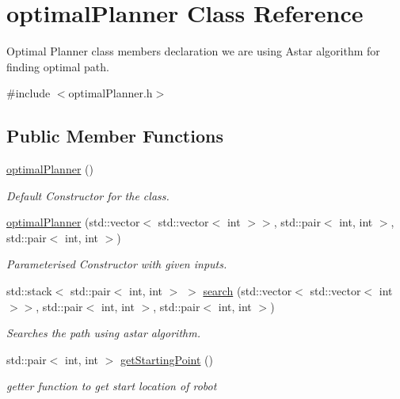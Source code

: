 \hypertarget{classoptimalPlanner}{}\section{optimal\+Planner Class Reference}
\label{classoptimalPlanner}


Optimal Planner class members declaration we are using Astar algorithm for finding optimal path.  




{\ttfamily \#include $<$optimal\+Planner.\+h$>$}

\subsection*{Public Member Functions}
\begin{DoxyCompactItemize}
\item 
\hyperlink{classoptimalPlanner_a7e8d3560aee12ecf15c0b12e44a657d1}{optimal\+Planner} ()
\begin{DoxyCompactList}\small\item\em Default Constructor for the class. \end{DoxyCompactList}\item 
\hyperlink{classoptimalPlanner_a00822a341c20c01a0f13cf71700023ae}{optimal\+Planner} (std\+::vector$<$ std\+::vector$<$ int $>$$>$, std\+::pair$<$ int, int $>$, std\+::pair$<$ int, int $>$)
\begin{DoxyCompactList}\small\item\em Parameterised Constructor with given inputs. \end{DoxyCompactList}\item 
std\+::stack$<$ std\+::pair$<$ int, int $>$ $>$ \hyperlink{classoptimalPlanner_a234f4f638c9fa4fb3eb539a4c5f715a5}{search} (std\+::vector$<$ std\+::vector$<$ int $>$$>$, std\+::pair$<$ int, int $>$, std\+::pair$<$ int, int $>$)
\begin{DoxyCompactList}\small\item\em Searches the path using astar algorithm. \end{DoxyCompactList}\item 
std\+::pair$<$ int, int $>$ \hyperlink{classoptimalPlanner_afb26d5b89c5a4cd5caec0ada6bd1921b}{get\+Starting\+Point} ()
\begin{DoxyCompactList}\small\item\em getter function to get start location of robot \end{DoxyCompactList}\item 

\end{DoxyCompactItemize}
